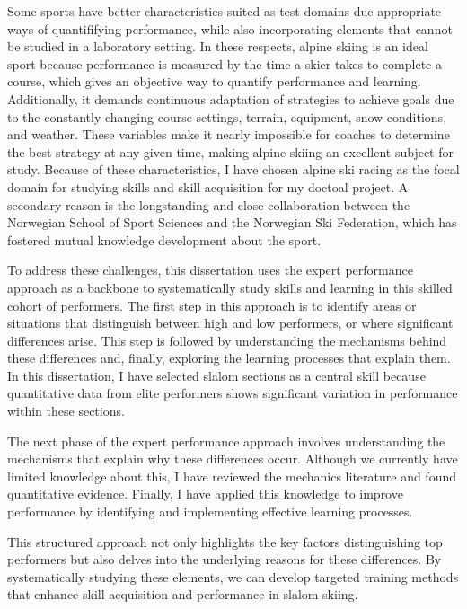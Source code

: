 Some sports have better characteristics suited as test domains due appropriate ways of quantififying performance, while also incorporating elements that cannot be studied in a laboratory setting. In these respects, alpine skiing is an ideal sport because performance is measured by the time a skier takes to complete a course, which gives an objective way to quantify performance and learning. Additionally, it demands continuous adaptation of strategies to achieve goals due to the constantly changing course settings, terrain, equipment, snow conditions, and weather. These variables make it nearly impossible for coaches to determine the best strategy at any given time, making alpine skiing an excellent subject for study. Because of these characteristics, I have chosen alpine ski racing as the focal domain for studying skills and skill acquisition for my doctoal project. A secondary reason is the longstanding and close collaboration between the Norwegian School of Sport Sciences and the Norwegian Ski Federation, which has fostered mutual knowledge development about the sport.

To address these challenges, this dissertation uses the expert performance approach as a backbone to systematically study skills and learning in this skilled cohort of performers. The first step in this approach is to identify areas or situations that distinguish between high and low performers, or where significant differences arise. This step is followed by understanding the mechanisms behind these differences and, finally, exploring the learning processes that explain them. In this dissertation, I have selected slalom sections as a central skill because quantitative data from elite performers shows significant variation in performance within these sections.

The next phase of the expert performance approach involves understanding the mechanisms that explain why these differences occur. Although we currently have limited knowledge about this, I have reviewed the mechanics literature and found quantitative evidence. Finally, I have applied this knowledge to improve performance by identifying and implementing effective learning processes.

This structured approach not only highlights the key factors distinguishing top performers but also delves into the underlying reasons for these differences. By systematically studying these elements, we can develop targeted training methods that enhance skill acquisition and performance in slalom skiing.

